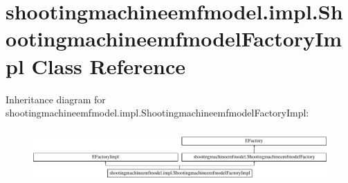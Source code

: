 \hypertarget{classshootingmachineemfmodel_1_1impl_1_1_shootingmachineemfmodel_factory_impl}{\section{shootingmachineemfmodel.\-impl.\-Shootingmachineemfmodel\-Factory\-Impl Class Reference}
\label{classshootingmachineemfmodel_1_1impl_1_1_shootingmachineemfmodel_factory_impl}
}
Inheritance diagram for shootingmachineemfmodel.\-impl.\-Shootingmachineemfmodel\-Factory\-Impl\-:\begin{figure}[H]
\begin{center}
\leavevmode
\includegraphics[height=2.038835cm]{classshootingmachineemfmodel_1_1impl_1_1_shootingmachineemfmodel_factory_impl}
\end{center}
\end{figure}
